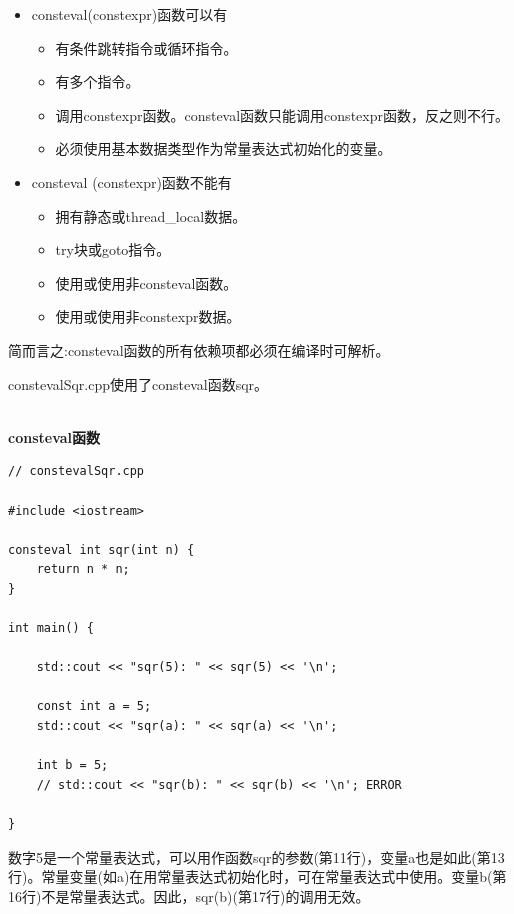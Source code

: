 \begin{itemize}
\item 
consteval(constexpr)函数可以有
\begin{itemize}
\item 
有条件跳转指令或循环指令。

\item 
有多个指令。

\item 
调用constexpr函数。consteval函数只能调用constexpr函数，反之则不行。

\item 
必须使用基本数据类型作为常量表达式初始化的变量。
\end{itemize}

\item 
consteval (constexpr)函数不能有
\begin{itemize}
\item 
拥有静态或thread\_local数据。

\item 
try块或goto指令。

\item 
使用或使用非consteval函数。

\item 
使用或使用非constexpr数据。
\end{itemize}
\end{itemize}

简而言之:consteval函数的所有依赖项都必须在编译时可解析。

constevalSqr.cpp使用了consteval函数sqr。

\hspace*{\fill} \\ %
\noindent
\textbf{consteval函数}
\begin{lstlisting}[style=styleCXX]
// constevalSqr.cpp

#include <iostream>

consteval int sqr(int n) {
	return n * n;
}

int main() {

	std::cout << "sqr(5): " << sqr(5) << '\n';
	
	const int a = 5;
	std::cout << "sqr(a): " << sqr(a) << '\n';
	
	int b = 5;
	// std::cout << "sqr(b): " << sqr(b) << '\n'; ERROR

}
\end{lstlisting}

数字5是一个常量表达式，可以用作函数sqr的参数(第11行)，变量a也是如此(第13行)。常量变量(如a)在用常量表达式初始化时，可在常量表达式中使用。变量b(第16行)不是常量表达式。因此，sqr(b)(第17行)的调用无效。

